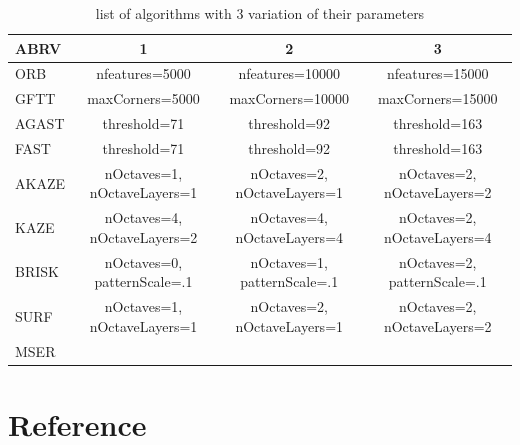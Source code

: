 \documentclass[]{elsarticle}
\begin{document}
	\begin{table}[!htb]
		\begin{tabular}{|l|c|c|c| } 
			\hline
			ABRV & 1 & 2 & 3 \\
			\hline
			ORB & nfeatures=5000 & nfeatures=10000 & nfeatures=15000 \\
			GFTT & maxCorners=5000 & maxCorners=10000 & maxCorners=15000 \\
			AGAST & threshold=71 & threshold=92 & threshold=163 \\
			FAST & threshold=71 & threshold=92 & threshold=163 \\
			AKAZE & nOctaves=1, nOctaveLayers=1 & nOctaves=2, nOctaveLayers=1 & nOctaves=2, nOctaveLayers=2 \\
			KAZE & nOctaves=4, nOctaveLayers=2 & nOctaves=4, nOctaveLayers=4 & nOctaves=2, nOctaveLayers=4 \\
			BRISK & nOctaves=0, patternScale=.1 & nOctaves=1, patternScale=.1 & nOctaves=2, patternScale=.1  \\
			SURF & nOctaves=1, nOctaveLayers=1 & nOctaves=2, nOctaveLayers=1 & nOctaves=2, nOctaveLayers=2 \\
			MSER & & & \\
			\hline
		\end{tabular}
		\caption{list of algorithms with 3 variation of their parameters}
		\label{tab:used-algorithms}
	\end{table}
	
	\section{Reference}
	
	
	
\end{document}
